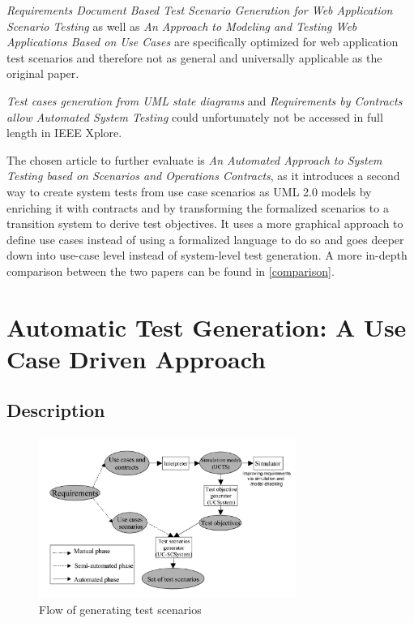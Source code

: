 \textit{Requirements Document Based Test Scenario Generation for Web Application Scenario Testing} as well as \textit{An Approach to Modeling and Testing Web Applications Based on Use Cases} are specifically optimized for web application test scenarios and therefore not as general and universally applicable as the original paper.

\textit{Test cases generation from UML state diagrams} and \textit{Requirements by Contracts allow Automated System Testing} could unfortunately not be accessed in full length in IEEE Xplore.

The chosen article to further evaluate is \textit{An Automated Approach to System Testing based on Scenarios and Operations Contracts}, as it introduces a second way to create system tests from use case scenarios as UML 2.0 models by enriching it with contracts and by transforming the formalized scenarios to a transition system to derive test objectives. It uses a more graphical approach to define use cases instead of using a formalized language to do so and goes deeper down into use-case level instead of system-level test generation. A more in-depth comparison between the two papers can be found in \autoref{comparison}.

\section{Automatic Test Generation: A Use Case Driven Approach} \label{approachone}

\subsection{Description}

\begin{figure}[h]
	\centering
	\includegraphics[width=0.75\textwidth]{./images/transitionsystemflow.png}
	\caption{Flow of generating test scenarios \cite{ClementineNebut2006}}
	\label{tsf}
\end{figure}

